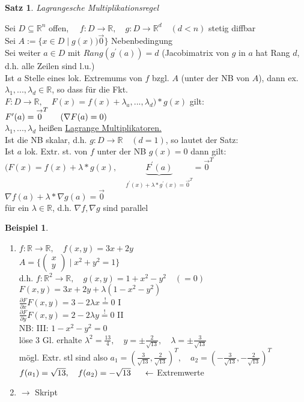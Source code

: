\documentclass[a4paper,11pt]{article}
\newtheorem{satz}[definition]{Satz}
\newtheorem{bsp}[definition]{Beispiel}
\newcommand{\hsp}{\hspace{5mm}}
\begin{document}
\begin{satz}
	Lagrangesche Multiplikationsregel
\end{satz}
Sei $D\subseteq\mathbb{R}^n$ offen, $\quad f\colon D\to\mathbb{R},\quad g\colon D\to\mathbb{R}^d\quad (d<n)$ stetig diffbar \\
Sei $A:=\{x\in D\mid g(x))\overset{\rightarrow}{0}\}$ Nebenbedingung \\
Sei weiter $a\in D$ mit $Rang(g^\prime(a))=d$ (Jacobimatrix von $g$ in $a$ hat Rang $d$, d.h. alle Zeilen sind l.u.) \\
Ist $a$ Stelle eines lok. Extremums von $f$ bzgl. $A$ (unter der NB von $A$), dann ex. $\lambda_1,...,\lambda_d\in\mathbb{R}$, so dass für die Fkt. \\
$F\colon D\to\mathbb{R},\quad F(x)=f(x)+\lambda_a,...,\lambda_d)*g(x)$ gilt: \\
$F^\prime(a)=\overset{\rightarrow}{0}^T\hsp(\nabla F(a)=0)$ \\
$\lambda_1,...,\lambda_d$ heißen \underline{Lagrange Multiplikatoren.} \\
Ist die NB skalar, d.h. $g\colon D\to\mathbb{R}\quad(d=1)$, so lautet der Satz: \\
Ist $a$ lok. Extr. st. von $f$ unter der NB $g(x)=0$ dann gilt: \\
$(F(x)=f(x)+\lambda*g(x),\quad \underbrace{F^\prime(a)}_{f^\prime(x)+\lambda*g^\prime(x)=\overset{\rightarrow}{0}^T}=\overset{\rightarrow}{0}^T$ \\
$\nabla f(a)+\lambda*\nabla g(a)=\overset{\rightarrow}{0}$ \\
für ein $\lambda\in\mathbb{R}$, d.h. $\nabla f,\nabla g$ sind parallel

\begin{bsp}
\end{bsp}
\begin{enumerate}[label=\alph*)]
	\item $f\colon\mathbb{R}\to\mathbb{R},\quad f(x,y)=3x+2y$ \\
	$A=\{\begin{pmatrix}x\\y\end{pmatrix}\mid x^2+y^2=1\}$ \\
	d.h. $f\colon\mathbb{R}^2\to\mathbb{R},\quad g(x,y)=1+x^2-y^2\quad(=0)$ \\
	$F(x,y)=3x+2y+\lambda(1-x^2-y^2)$ \\
	$\frac{\partial F}{\partial x}F(x,y) =3-2\lambda x\overset{!}{=}0$ I \\
	$\frac{\partial F}{\partial y}F(x,y)=2-2\lambda y\overset{!}{=}0$ II \\
	NB: III: $1-x^2-y^2=0$ \\
	löse 3 Gl. erhalte $\lambda^2=\frac{13}{4},\quad y=\pm\frac{2}{\sqrt{13}},\quad\lambda=\pm\frac{3}{\sqrt{13}}$ \\
	mögl. Extr. stl sind also $a_1=(\frac{3}{\sqrt{13}},\frac{2}{\sqrt{13}})^T,\quad a_2=(-\frac{3}{\sqrt{13}},-\frac{2}{\sqrt{13}})^T$ \\
	$f(a_1)=\sqrt{13},\quad f(a_2)=-\sqrt{13}\hsp\leftarrow$ Extremwerte
	\item $\rightarrow$ Skript 
\end{enumerate}
\end{document}
